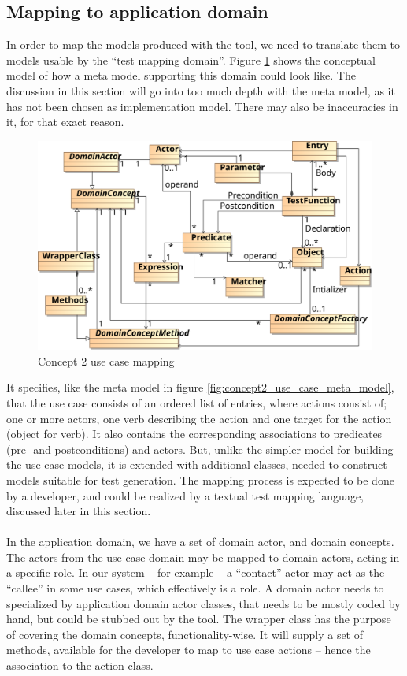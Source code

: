 \subsection{Mapping to application domain}
In order to map the models produced with the tool, we need to translate them to models usable by the ``test mapping domain''. Figure \ref{fig:concept2_use_case_mapping} shows the conceptual model of how a meta model supporting this domain could look like. The discussion in this section will go into too much depth with the meta model, as it has not been chosen as implementation model. There may also be inaccuracies in it, for that exact reason.
\begin{figure}[!htbp]
  \centering
  \includegraphics[scale=0.72]{img/concept2_use_case_mapping}
  \caption{Concept 2 use case mapping}
  \label{fig:concept2_use_case_mapping}
\end{figure}It specifies, like the meta model in figure \ref{fig:concept2_use_case_meta_model}, that the use case consists of an ordered list of entries, where actions consist of; one or more actors, one verb describing the action and one target for the action (object for verb). It also contains the corresponding associations to predicates (pre- and postconditions) and actors. But, unlike the simpler model for building the use case models, it is extended with additional classes, needed to construct models suitable for test generation. The mapping process is expected to be done by a developer, and could be realized by a textual test mapping language, discussed later in this section.\\\\
In the application domain, we have a set of domain actor, and domain concepts. The actors from the use case domain may be mapped to domain actors, acting in a specific role. In our system -- for example -- a ``contact'' actor may act as the ``callee'' in some use cases, which effectively is a role. A domain actor needs to specialized by application domain actor classes, that needs to be mostly coded by hand, but could be stubbed out by the tool. The wrapper class has the purpose of covering the domain concepts, functionality-wise. It will supply a set of methods, available for the developer to map to use case actions -- hence the association to the action class.\\
